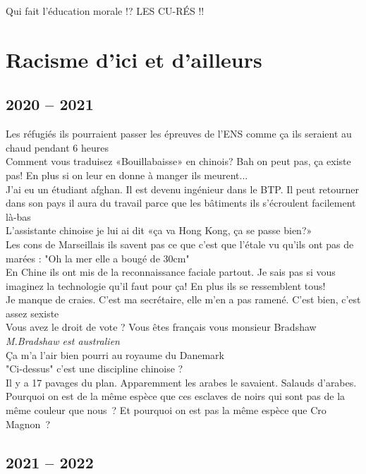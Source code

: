 \documentclass[french, a4paper, openany]{book}
\begin{document}
	\noindent \og Qui fait l'éducation morale !? LES CU-RÉS !! \fg \\

\chapter{Racisme d'ici et d'ailleurs}

\section{2020 -- 2021}

	\noindent \og Les réfugiés ils pourraient passer les épreuves de l'ENS comme ça ils seraient au chaud pendant 6 heures \fg \\
	\og Comment vous traduisez «Bouillabaisse» en chinois? Bah on peut pas, ça existe pas! En plus si on leur en donne à manger ils meurent... \fg \\
	\og J'ai eu un étudiant afghan. Il est devenu ingénieur dans le BTP. Il peut retourner dans son pays il aura du travail parce que les bâtiments ils s'écroulent facilement là-bas \fg \\
	\og L'assistante chinoise je lui ai dit «ça va Hong Kong, ça se passe bien?» \fg \\
	\og Les cons de Marseillais ils savent pas ce que c'est que l'étale vu qu'ils ont pas de marées : "Oh la mer elle a bougé de 30cm" \fg \\
	\og En Chine ils ont mis de la reconnaissance faciale partout. Je sais pas si vous imaginez la technologie qu'il faut pour ça! En plus ils se ressemblent tous! \fg \\
	\og Je manque de craies. C'est ma secrétaire, elle m'en a pas ramené. C'est bien, c'est assez sexiste \fg \\
	\og Vous avez le droit de vote ? Vous êtes français vous monsieur Bradshaw \fg \emph{M.Bradshaw est australien} \\
	\og Ça m'a l'air bien pourri au royaume du Danemark \fg \\
	\og "Ci-dessus" c'est une discipline chinoise ? \fg \\
	\og Il y a 17 pavages du plan. Apparemment les arabes le savaient. Salauds d'arabes. \fg \\
	\og Pourquoi on est de la même espèce que ces esclaves de noirs qui sont pas de la même couleur que nous~? Et pourquoi on est pas la même espèce que Cro Magnon~? \fg \\

\section{2021 -- 2022}
	
\end{document}

